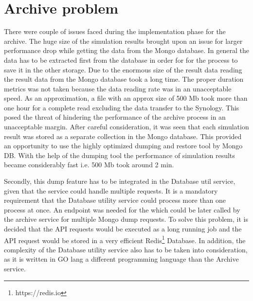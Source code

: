 \section{Archive problem}
There were couple of issues faced during the implementation phase for the archive. The huge size of the simulation results brought upon an issue for larger
performance drop while getting the data from the Mongo database. In general the data has to be extracted first from the database in order for for the process
to save it in the other storage. Due to the enormous size of the result data reading the result data from the Mongo database took a long time. The proper duration
metrics was not taken because the data reading rate was in an unacceptable speed. As an approximation, a file with an approx size of 500 Mb took more than one hour 
for a complete read excluding the data transfer to the Synology. This posed the threat of hindering the performance of the archive process in an unacceptable margin.
After careful consideration, it was seen that each simulation result was stored as a separate collection in the Mongo database. This provided an opportunity to use
the highly optimized dumping and restore tool by Mongo DB. With the help of the dumping tool the performance of simulation results became considerably fast i.e.
500 Mb took around 2 min.

Secondly, this dump feature has to be integrated in the Database util service, given that the service could handle multiple requests. It is a mandatory requirement that the Database
utility service could process more than one process at once. An endpoint was needed for the which could be later called by the archive service for multiple Mongo dump
requests. To solve this problem, it is decided that the API requests would be executed as a long running job and the API request would be stored in a very efficient 
Redis\footnote{https://redis.io} Database. In addition, the complexity of the Database utility service also has to be taken into consideration, as it 
is written in GO lang a different programming language than the Archive service.
